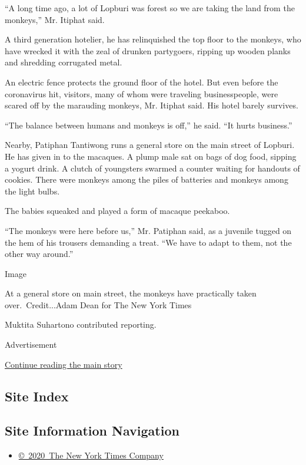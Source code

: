 ``A long time ago, a lot of Lopburi was forest so we are taking the land
from the monkeys,'' Mr. Itiphat said.

A third generation hotelier, he has relinquished the top floor to the
monkeys, who have wrecked it with the zeal of drunken partygoers,
ripping up wooden planks and shredding corrugated metal.

An electric fence protects the ground floor of the hotel. But even
before the coronavirus hit, visitors, many of whom were traveling
businesspeople, were scared off by the marauding monkeys, Mr. Itiphat
said. His hotel barely survives.

``The balance between humans and monkeys is off,'' he said. ``It hurts
business.''

Nearby, Patiphan Tantiwong runs a general store on the main street of
Lopburi. He has given in to the macaques. A plump male sat on bags of
dog food, sipping a yogurt drink. A clutch of youngsters swarmed a
counter waiting for handouts of cookies. There were monkeys among the
piles of batteries and monkeys among the light bulbs.

The babies squeaked and played a form of macaque peekaboo.

``The monkeys were here before us,'' Mr. Patiphan said, as a juvenile
tugged on the hem of his trousers demanding a treat. ``We have to adapt
to them, not the other way around.''

Image

At a general store on main street, the monkeys have practically taken
over.~Credit...Adam Dean for The New York Times

Muktita Suhartono contributed reporting.

Advertisement

\protect\hyperlink{after-bottom}{Continue reading the main story}

\hypertarget{site-index}{%
\subsection{Site Index}\label{site-index}}

\hypertarget{site-information-navigation}{%
\subsection{Site Information
Navigation}\label{site-information-navigation}}

\begin{itemize}
\tightlist
\item
  \href{https://help.nytimes.com/hc/en-us/articles/115014792127-Copyright-notice}{©~2020~The
  New York Times Company}
\end{itemize}

